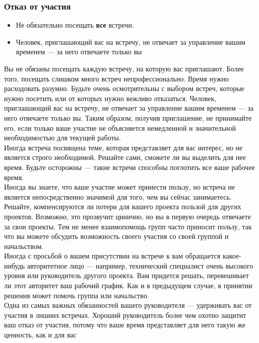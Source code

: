 \documentclass{../industrial-development}
\begin{document}
\begin{frame} \frametitle{Отказ от участия}
\begin{itemize}
  \item Не обязательно посещать \textbf{все} встречи.
  \item Человек, приглашающий вас на встречу, не отвечает за управление вашим временем — за него отвечаете только вы
\end{itemize}
\end{frame}
\lecturenotes
Вы не обязаны посещать каждую встречу, на которую вас приглашают. Более того, посещать слишком много встреч непрофессионально. Время нужно расходовать разумно. Будьте очень осмотрительны с выбором встреч, которые нужно посетить или от которых нужно вежливо отказаться. Человек, приглашающий вас на встречу, не отвечает за управление вашим временем — за него отвечаете только вы. Таким образом, получив приглашение, не принимайте его, если только ваше участие не объясняется немедленной и значительной необходимостью для текущей работы.\\
Иногда встреча посвящена теме, которая представляет для вас интерес, но не является строго необходимой. Решайте сами, сможете ли вы выделить для нее время. Будьте осторожны — такие встречи способны поглотить все ваше рабочее время.\\
Иногда вы знаете, что ваше участие может принести пользу, но встреча не является непосредственно значимой для того, чем вы сейчас занимаетесь. Решайте, компенсируются ли потери для вашего проекта пользой для других проектов. Возможно, это прозвучит цинично, но вы в первую очередь отвечаете за свои проекты. Тем не менее взаимопомощь групп часто приносит пользу, так что вы можете обсудить возможность своего участия со своей группой и начальством.\\
Иногда с просьбой о вашем присутствии на встрече к вам обращается какое-нибудь авторитетное лицо — например, технический специалист очень высокого уровня или руководитель другого проекта. Вам придется решать, перевешивает ли этот авторитет ваш рабочий график. Как и в предыдущем случае, в принятии решения может помочь группа или начальство.\\
Одна из самых важных обязанностей вашего руководителя — удерживать вас от участия в лишних встречах. Хороший руководитель более чем охотно защитит ваш отказ от участия, потому что ваше время представляет для него такую же ценность, как и для вас
\end{document}

